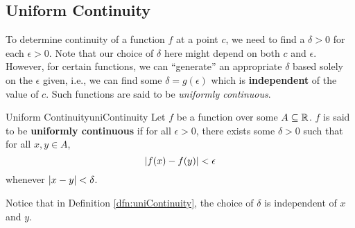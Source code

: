 \documentclass[math]{amznotes}
\theoremstyle{remark}
\begin{document}
\subsection{Uniform Continuity}
To determine continuity of a function $f$ at a point $c$, we need to find a $\delta > 0$ for each $\epsilon > 0$. Note that our choice of $\delta$ here might depend on both $c$ and $\epsilon$. However, for certain functions, we can ``generate'' an appropriate $\delta$ based solely on the $\epsilon$ given, i.e., we can find some $\delta = g(\epsilon)$ which is \textbf{independent} of the value of $c$. Such functions are said to be \textit{uniformly continuous}.
\begin{dfnbox}{Uniform Continuity}{uniContinuity}
    Let $f$ be a function over some $A \subseteq \mathbb{R}$. $f$ is said to be {\color{red} \textbf{uniformly continuous}} if for all $\epsilon > 0$, there exists some $\delta > 0$ such that for all $x, y \in A$, 
    \begin{equation*}
        {\left\lvert {f(x) - f(y)} \right\rvert} < \epsilon
    \end{equation*}
    whenever ${\left\lvert {x - y} \right\rvert} <\delta$.
\end{dfnbox}
Notice that in Definition \ref{dfn:uniContinuity}, the choice of $\delta$ is independent of $x$ and $y$.
\end{document}
